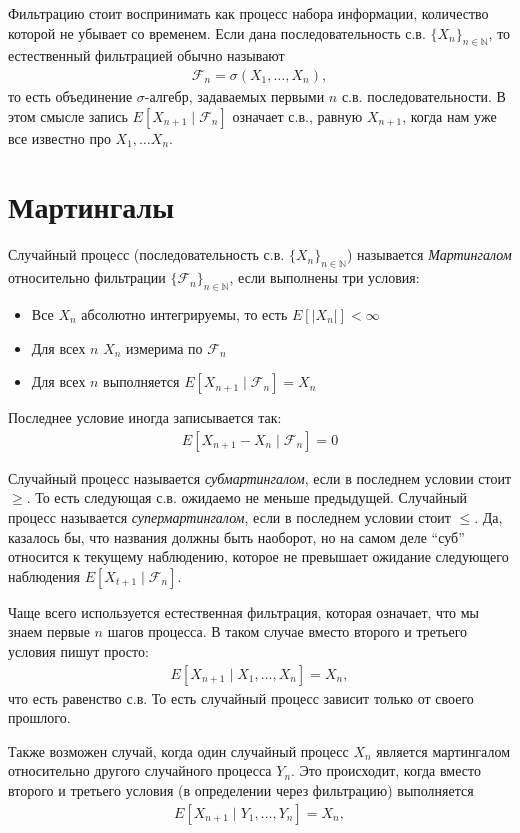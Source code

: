 \documentclass[12pt]{article}
\newcommand\N{\mathbb{N}}
\newcommand\F{\mathcal{F}}
\begin{document}
Фильтрацию стоит воспринимать как процесс набора информации, количество которой не убывает со временем. Если дана последовательность с.в. $\{X_n\}_{n \in \N}$, то естественный фильтрацией обычно называют 
\begin{align*}
  \F_n = \sigma(X_1, \dots, X_n),
\end{align*} 
то есть объединение $\sigma$-алгебр, задаваемых первыми $n$ с.в. последовательности. В этом смысле запись $E[X_{n + 1} \mid \F_n]$ означает с.в., равную $X_{n + 1}$, когда нам уже все известно про $X_1, \dots X_n$.

\section{Мартингалы}

Случайный процесс (последовательность с.в. $\{X_n\}_{n \in \N}$) называется \emph{Мартингалом} относительно фильтрации $\{\F_n\}_{n \in \N}$, если выполнены три условия:
\begin{itemize}
  \item Все $X_n$ абсолютно интегрируемы, то есть $E[|X_n|] < \infty$
  \item Для всех $n$ $X_n$ измерима по $\F_n$
  \item Для всех $n$ выполняется $E[X_{n + 1} \mid \F_n] = X_n$
\end{itemize}

Последнее условие иногда записывается так:
\begin{align*}
  E[X_{n + 1} - X_n \mid \F_n] = 0
\end{align*}

Случайный процесс называется \emph{субмартингалом}, если в последнем условии стоит $\ge$. То есть следующая с.в. ожидаемо не меньше предыдущей. Случайный процесс называется \emph{супермартингалом}, если в последнем условии стоит $\le$. Да, казалось бы, что названия должны быть наоборот, но на самом деле ``суб'' относится к текущему наблюдению, которое не превышает ожидание следующего наблюдения $E[X_{t + 1} \mid \F_n]$.

Чаще всего используется естественная фильтрация, которая означает, что мы знаем первые $n$ шагов процесса. В таком случае вместо второго и третьего условия пишут просто:
\begin{align*}
  E[X_{n + 1} \mid X_1, \dots, X_n] = X_n,
\end{align*}
что есть равенство с.в. То есть случайный процесс зависит только от своего прошлого. 

Также возможен случай, когда один случайный процесс $X_n$ является мартингалом относительно другого случайного процесса $Y_n$. Это происходит, когда вместо второго и третьего условия (в определении через фильтрацию) выполняется
\begin{align*}
  E[X_{n + 1} \mid Y_1, \dots, Y_n] = X_n,
\end{align*}
\end{document}
